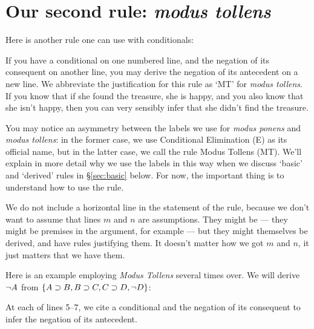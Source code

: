 \section{Our second rule: \emph{modus tollens}}

Here is another rule one can use with conditionals:

\begin{ndproof}
	 
\end{ndproof}

If you have a conditional on one numbered line, and the negation of its consequent on another line, you may derive the negation of its antecedent on a new line. We abbreviate the justification for this rule as `MT' for \emph{modus tollens}. If you know that if she found the treasure, she is happy, and you also know that she isn't happy, then you can very sensibly infer that she didn't find the treasure.

You may notice an asymmetry between the labels we use for \emph{modus ponens} and \emph{modus tollens}: in the former case, we use Conditional Elimination (\eif E) as its official name, but in the latter case, we call the rule Modus Tollens (MT). We'll explain in more detail why we use the labels in this way when we discuss `basic' and `derived' rules in \S\ref{sec:basic} below. For now, the important thing is to understand how to use the rule.

We do not include a horizontal line in the statement of the rule, because we don't want to assume that lines $m$ and $n$ are assumptions. They might be --- they might be premises in the argument, for example --- but they might themselves be derived, and have rules justifying them. It doesn't matter how we got $m$ and $n$, it just matters that we have them.

Here is an example employing \emph{Modus Tollens} several times over. We will derive $\neg A$ from $\{A \supset B, B \supset C, C \supset D, \neg D\}$:

\begin{ndproof}
	 
	 
	 
	 
\end{ndproof}

At each of lines 5--7, we cite a conditional and the negation of its consequent to infer the negation of its antecedent.


